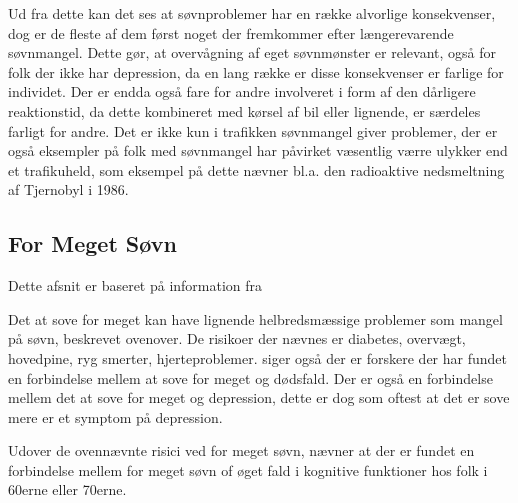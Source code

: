 Ud fra dette kan det ses at søvnproblemer har en række alvorlige konsekvenser, dog er de fleste af dem først noget der fremkommer efter længerevarende søvnmangel.
Dette gør, at overvågning af eget søvnmønster er relevant, også for folk der ikke har depression, da en lang række er disse konsekvenser er farlige for individet.
Der er endda også fare for andre involveret i form af den dårligere reaktionstid, da dette kombineret med kørsel af bil eller lignende, er særdeles farligt for andre.
Det er ikke kun i trafikken søvnmangel giver problemer, der er også eksempler på folk med søvnmangel har påvirket væsentlig værre ulykker end et trafikuheld, som eksempel på dette nævner \citet{misc:tenThings} bl.a. den radioaktive nedsmeltning af Tjernobyl i 1986.

\subsection{For Meget Søvn}
Dette afsnit er baseret på information fra \citep{misc:oversleep} \citep{misc:longsleepsurvey}

Det at sove for meget kan have lignende helbredsmæssige problemer som mangel på søvn, beskrevet ovenover.
De risikoer der nævnes er diabetes, overvægt, hovedpine, ryg smerter, hjerteproblemer.
\citet{misc:oversleep} siger også der er forskere der har fundet en forbindelse mellem at sove for meget og dødsfald.
Der er også en forbindelse mellem det at sove for meget og depression, dette er dog som oftest at det er sove mere er et symptom på depression.

Udover de ovennævnte risici ved for meget søvn, nævner \citet{misc:brainsleep} at der er fundet en forbindelse mellem for meget søvn of øget fald i kognitive funktioner hos folk i 60erne eller 70erne.

